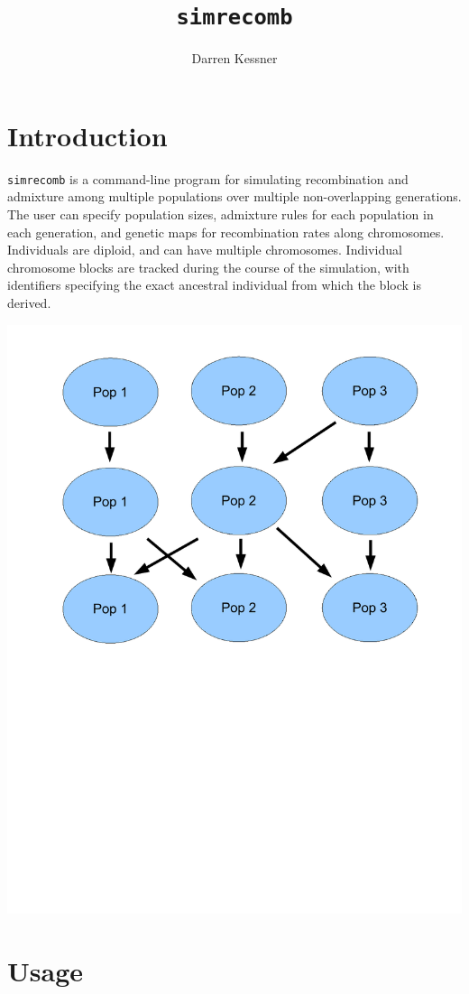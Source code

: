 \documentclass{article}
\begin{document}
\title{\texttt{simrecomb}}
\author{Darren Kessner}
\maketitle



\section{Introduction}


\texttt{simrecomb} is a command-line program for simulating recombination and
admixture among multiple populations over multiple non-overlapping generations.
The user can specify population sizes, admixture rules for each population in
each generation, and genetic maps for recombination rates along chromosomes.
Individuals are diploid, and can have multiple chromosomes.  Individual
chromosome blocks are tracked during the course of the simulation, with
identifiers specifying the exact ancestral individual from which the block is
derived.

\begin{center}
\includegraphics[width=.50\textwidth]{fig/simrecomb_cartoon.pdf}
\end{center}



\section{Usage}
\end{document}
